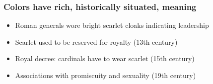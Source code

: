 \documentclass[presentation]{subfiles}
\begin{document}

\begin{frame}\frametitle{Colors have rich, historically situated, meaning}
\begin{itemize}
    \item<+->{Roman generals wore bright scarlet cloaks indicating leadership}
  
    \item<+->{Scarlet used to be reserved for royalty (13th century)}
    
    \item<+->{Royal decree: cardinals have to wear scarlet (15th century)}
      
    \item<+->{Associations with promiscuity and sexuality (19th century)}
\end{itemize}



\end{frame}
\end{document}
